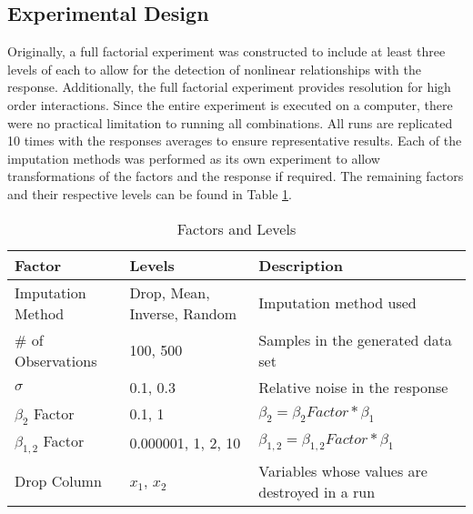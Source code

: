 \documentclass[../../paper.tex]{subfiles}
\begin{document}
\subsection{Experimental Design}
Originally, a full factorial experiment was constructed to include at least three levels of each to allow for the detection of nonlinear relationships with the response.
Additionally, the full factorial experiment provides resolution for high order interactions. Since the entire experiment is executed on a computer, there were no practical limitation to running all combinations.
All runs are replicated 10 times with the responses averages to ensure representative results.
Each of the imputation methods was performed as its own experiment to allow transformations of the factors and the response if required. The remaining factors and their respective levels can be found in Table \ref{table:factors_and_levels}.


\begin{table}[H]
\begin{center}\label{table:factors_and_levels}
    \begin{tabular}{  l | p{1.9in} | l   }

      \rule{0pt}{14pt} \textbf{Factor} & \textbf{Levels} & \textbf{Description} \\ \hline
      \rule{0pt}{14pt} Imputation Method & Drop, Mean, Inverse, Random & Imputation method used \\ %
      \rule{0pt}{14pt} \# of Observations & 100, 500 &  Samples in the generated data set \\ %
      \rule{0pt}{14pt} $\sigma$ & 0.1, 0.3 &  Relative noise in the response \\ %
      \rule{0pt}{14pt} $\beta_{2}$ Factor & 0.1, 1 &  $\beta_{2} = \beta_{2} Factor * \beta_{1}$ \\ %
      \rule{0pt}{14pt} $\beta_{1,2}$ Factor & 0.000001, 1, 2, 10 &  $\beta_{1,2} = \beta_{1,2} Factor * \beta_{1}$ \\ %
      \rule{0pt}{14pt} Drop Column & $x_{1}$, $x_{2}$ & Variables whose values are destroyed in a run \\ %
    \end{tabular}
    \caption{Factors and Levels}\label{table:factors_and_levels}
\end{center}
\end{table}
\end{document}
